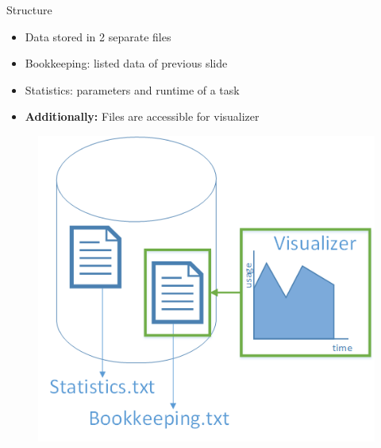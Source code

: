 	\begin{frame}{Structure}
		\begin{minipage}[]{.5\textwidth}%
		\begin{itemize}
		\item<2->{} {Data stored in 2 separate files}
		\item<3->{} {Bookkeeping: listed data of previous slide}
		\item<4->{} {Statistics: parameters and runtime of a task}
		\item<5->{} {\textbf{Additionally: }Files are accessible for visualizer}
		\end{itemize}
		\end{minipage}
		\begin{minipage}[]{.45\textwidth}%
		\begin{figure}[h]
		\flushright  %
		\vspace{-\ht\strutbox}\includegraphics[width=\textwidth]{images/Task/data.png}
		\end{figure}
		\end{minipage}
	\end{frame}
